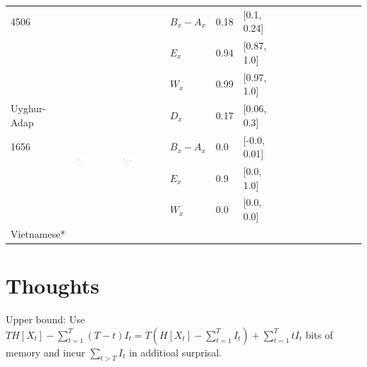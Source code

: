 \documentclass[11pt,letterpaper]{article}
\begin{document}
\begin{longtable}{lllllllllllllll}
4506  &    &    &  $B_x-A_x$  &  0.18  &  [0.1, 0.24]  \\ 
  &    &    &  $E_x$  &  0.94  &  [0.87, 1.0]  \\ 
  &    &    &  $W_x$  &  0.99  &  [0.97, 1.0]  \\ [10.25ex] \hline
Uyghur-Adap  &  \multirow{4}{*}{\includegraphics[width=0.25\textwidth]{figures/Uyghur-Adap-entropy-memory.pdf}}  &  \multirow{4}{*}{\includegraphics[width=0.25\textwidth]{figures/Uyghur-Adap-listener-surprisal-memory.pdf}}  &  $D_x$  &  0.17  &  [0.06, 0.3]  \\ 
1656  &    &    &  $B_x-A_x$  &  0.0  &  [-0.0, 0.01]  \\ 
  &    &    &  $E_x$  &  0.9  &  [0.0, 1.0]  \\ 
  &    &    &  $W_x$  &  0.0  &  [0.0, 0.0]  \\ [10.25ex] \hline
Vietnamese* &\\ [10.25ex] \hline
\end{longtable}


\section{Thoughts}
Upper bound: Use $TH[X_t] - \sum_{t=1}^T (T-t) I_t = T (H[X_t] - \sum_{t=1}^T I_t) + \sum_{t=1}^T t I_t$ bits of memory and incur $\sum_{t>T} I_t$ in additioal surprisal. 
\end{document}
